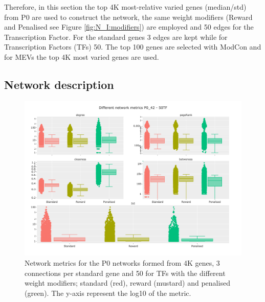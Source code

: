 Therefore, in this section the top 4K most-relative varied genes (median/std) from P0 are used to construct the network, the same weight modifiers (Reward and Penalised see Figure \ref{fig:N_I:modifiers}) are employed and 50 edges for the Transcription Factor. For the standard genes 3 edges are kept while for Transcription Factors (TFs) 50. The top 100 genes are selected with ModCon and for MEVs the top 4K most varied genes are used.

\subsection{Network description}


\begin{figure}[!htb]    
    \centering
    \includegraphics[width=1.0\textwidth,height=0.7\textheight,keepaspectratio]{Sections/Network_I/Resources/P0/P0_NetworkMetricsComp_50TF_2.png}
    \caption{Network metrics for the P0 networks formed from 4K genes, 3 connections per standard gene and 50 for TFs with the different weight modifiers; standard (red), reward (mustard) and penalised (green). The y-axis represent the log10 of the metric. }
    \label{fig:N_I:net_metrics_p0}
\end{figure}

